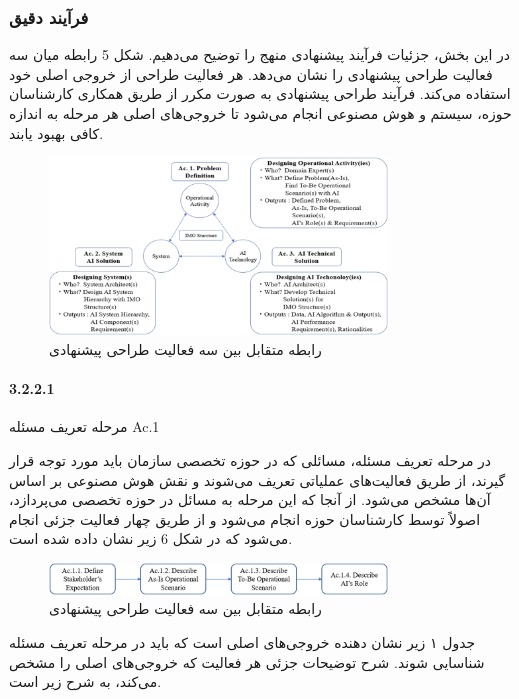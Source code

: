 \documentclass[a4paper,10pt]{article}
\begin{document}
            \subsubsection{فرآیند دقیق}

                در این بخش، جزئیات فرآیند پیشنهادی منهج را توضیح می‌دهیم. شکل 5 رابطه میان سه فعالیت طراحی پیشنهادی را نشان می‌دهد. هر فعالیت طراحی از خروجی اصلی خود استفاده می‌کند. فرآیند طراحی پیشنهادی به صورت مکرر از طریق همکاری کارشناسان حوزه، سیستم و هوش مصنوعی انجام می‌شود تا خروجی‌های اصلی هر مرحله به اندازه کافی بهبود یابند.

                \begin{figure}[htbp]

                    \centering
                    \includegraphics[width=0.8\textwidth]{image/fig 5.png}
                    \caption{رابطه متقابل بین سه فعالیت طراحی پیشنهادی}
                    \label{fig:fig_5}
                
                \end{figure}

                \paragraph{3.2.2.1}{مرحله تعریف مسئله Ac.1}

                    در مرحله تعریف مسئله، مسائلی که در حوزه تخصصی سازمان باید مورد توجه قرار گیرند، از طریق فعالیت‌های عملیاتی تعریف می‌شوند و نقش هوش مصنوعی بر اساس آن‌ها مشخص می‌شود. از آنجا که این مرحله به مسائل در حوزه تخصصی می‌پردازد، اصولاً توسط کارشناسان حوزه انجام می‌شود و از طریق چهار فعالیت جزئی انجام می‌شود که در شکل 6 زیر نشان داده شده است.

                    \begin{figure}[htbp]

                        \centering
                        \includegraphics[width=0.8\textwidth]{image/fig 6.png}
                        \caption{رابطه متقابل بین سه فعالیت طراحی پیشنهادی}
                        \label{fig:fig_6}
                    
                    \end{figure}

                    جدول ۱ زیر نشان دهنده خروجی‌های اصلی است که باید در مرحله تعریف مسئله شناسایی شوند. شرح توضیحات جزئی هر فعالیت که خروجی‌های اصلی را مشخص می‌کند، به شرح زیر است.
\end{document}
